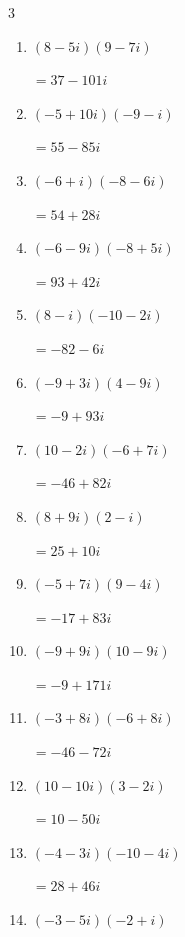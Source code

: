 \begin{multicols}{3}
\begin{enumerate}
  \item $\displaystyle (8-5i)(9-7i)$

        $\displaystyle =37-101i$

  \item $\displaystyle (-5+10i)(-9-i)$

        $\displaystyle =55-85i$

  \item $\displaystyle (-6+i)(-8-6i)$

        $\displaystyle =54+28i$

  \item $\displaystyle (-6-9i)(-8+5i)$

        $\displaystyle =93+42i$

  \item $\displaystyle (8-i)(-10-2i)$

        $\displaystyle =-82-6i$

  \item $\displaystyle (-9+3i)(4-9i)$

        $\displaystyle =-9+93i$

  \item $\displaystyle (10-2i)(-6+7i)$

        $\displaystyle =-46+82i$

  \item $\displaystyle (8+9i)(2-i)$

        $\displaystyle =25+10i$

  \item $\displaystyle (-5+7i)(9-4i)$

        $\displaystyle =-17+83i$

  \item $\displaystyle (-9+9i)(10-9i)$

        $\displaystyle =-9+171i$

\columnbreak %

  \item $\displaystyle (-3+8i)(-6+8i)$

        $\displaystyle =-46-72i$

  \item $\displaystyle (10-10i)(3-2i)$

        $\displaystyle =10-50i$

  \item $\displaystyle (-4-3i)(-10-4i)$

        $\displaystyle =28+46i$

  \item $\displaystyle (-3-5i)(-2+i)$


\end{enumerate}
\end{multicols}
